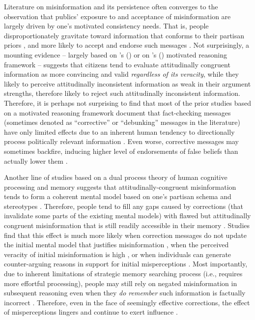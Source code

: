 \documentclass[man, 12pt, a4paper, nolmodern, noextraspace]{apa6}
\begin{document}
      Literature on misinformation and its persistence often converges to the observation that publics' exposure to and acceptance of misinformation are largely driven by one's motivated consistency needs. That is, people disproportionately gravitate toward information that conforms to their partisan priors \parencite{ weeks2014electoral, garrett2016driving}, and  more likely to accept and endorse such messages \parencite{nyhan2010corrections, guess2018selective}. Not surprisingly, a mounting evidence -- largely based on \citeauthor{kunda1990}'s (\citeyear{kunda1990}) or on \citeauthor{taber2006}'s (\citeyear{taber2006}) motivated reasoning framework -- suggests that citizens tend to evaluate attitudinally congruent information as more convincing and valid \emph{regardless of its veracity}, while they likely to perceive attitudinally inconsistent information as weak in their argument strengths, therefore likely to  reject such attitudinally inconsistent information. Therefore, it is perhaps not surprising to find that most of the prior studies based on a motivated reasoning framework document that fact-checking messages (sometimes denoted as \enquote{corrective} or \enquote{debunking} messages in the literature) have only limited effects due to an inherent human tendency to directionally process politically relevant information \parencite{thorson_2016, taber2006,flynn2017nature}. Even worse, corrective messages may sometimes backfire, inducing higher level of endorsements of false beliefs than actually lower them \parencites[e.g.,][]{nyhan2010corrections}[but see][]{Wood2018}.
      
      Another line of studies based on a dual process theory of human cognitive processing and memory suggests that attitudinally-congruent misinformation tends to form a coherent mental model based on one's partisan schema and stereotypes \parencite[e.g.,][]{garrett2013undermining, Lewandowsky_2012PSPI}. Therefore, people tend to fill any gaps caused by corrections (that invalidate some parts of the existing mental models) with flawed but attitudinally congruent misinformation that is still readily accessible in their memory \parencite{Lewandowsky_2012PSPI}. Studies find that this effect is much more likely when correction messages do not update the initial mental model that justifies misinformation \parencite{Chan_debunking_meta_2017}, when the perceived veracity of initial misinformation is high \parencite[due to fluency bias in one's cognitive processing:][]{Lewandowsky_2012PSPI}, or when individuals can generate counter-arguing reasons in support for initial misperceptions \parencite{garrett2013undermining, Chan_debunking_meta_2017}. Most importantly, due to inherent limitations of strategic memory searching process (i.e., requires more effortful processing), people may still rely on negated misinformation in subsequent reasoning even when they \emph{do remember} such information is factually incorrect \parencite{Lewandowsky_2012PSPI}. Therefore, even in the face of seemingly effective corrections, the effect of misperceptions lingers and continue to exert influence \parencite{thorson_2016}.  
      
\end{document}

